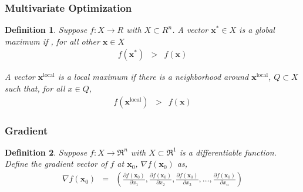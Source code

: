 \documentclass{beamer}
\newtheorem{thm}{Theorem}
\newtheorem{defn}{Definition}
\numberwithin{equation}{section}
\begin{document}
\begin{frame}
\frametitle{Multivariate Optimization}


\begin{defn} Suppose $f:X \rightarrow R$ with $X \subset R^{n}$.  A vector $\boldsymbol{x}^{*} \in X$ is a \alert{global maximum} if , for all other $\boldsymbol{x} \in X$ 
\begin{eqnarray}
f(\boldsymbol{x}^{*}) & > & f(\boldsymbol{x} ) \nonumber 
\end{eqnarray}

A vector $\boldsymbol{x}^{\text{local}}$ is a \alert{local} maximum if there is a neighborhood around $\boldsymbol{x}^{\text{local}}$, $Q \subset X$ such that, for all $x \in Q$, 
\begin{eqnarray}
f(\boldsymbol{x}^{\text{local} }) & > & f(\boldsymbol{x} ) \nonumber 
\end{eqnarray}
\end{defn}

\end{frame}











\begin{frame}
\frametitle{Gradient} 

\begin{defn} 
Suppose $f:X \rightarrow \Re^{n}$ with $X \subset \Re^{1}$ is a differentiable function.  Define the gradient vector of $f$ at $\boldsymbol{x}_{0}$, $\nabla f(\boldsymbol{x}_{0})$ as, 
\begin{eqnarray}
\nabla f (\boldsymbol{x}_{0})  & = & \left(\frac{\partial f (\boldsymbol{x}_{0}) }{\partial x_{1} }, \frac{\partial f (\boldsymbol{x}_{0}) }{\partial x_{2} }, \frac{\partial f (\boldsymbol{x}_{0}) }{\partial x_{3} }, \hdots, \frac{\partial f (\boldsymbol{x}_{0}) }{\partial x_{n} } \right) \nonumber 
\end{eqnarray}

\end{defn}



\end{frame}
\end{document}
